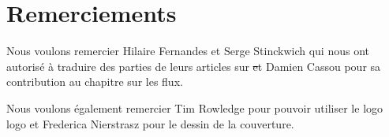 \documentclass[a4paper,10pt,twoside]{book}
\begin{document}
\section*{Remerciements}

Nous voulons remercier Hilaire Fernandes et Serge Stinckwich qui nous ont autoris\'e \`a traduire des parties de leurs articles sur \st et Damien Cassou pour sa contribution au chapitre sur les flux.

Nous voulons \'egalement remercier Tim Rowledge pour pouvoir utiliser le logo \sq logo et Frederica Nierstrasz pour le dessin de la couverture.

\ifx\wholebook\relax\else
   
   
\end{document}

